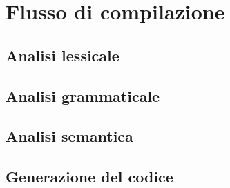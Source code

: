 \chapter{Flusso di compilazione}

\section{Analisi lessicale}

\section{Analisi grammaticale}

\section{Analisi semantica}

\section{Generazione del codice}
